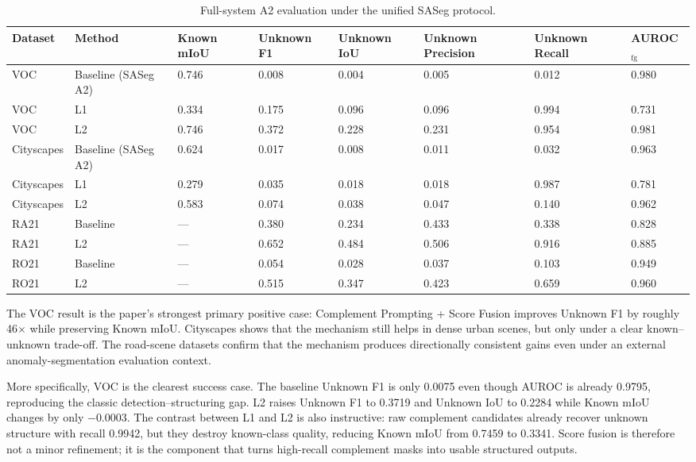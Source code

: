 \documentclass[a4paper,fleqn]{cas-dc}
\newcommand{\method}{Complement Prompting + Score Fusion}
\begin{document}
\begin{table}[!t]
  \caption{Full-system A2 evaluation under the unified SASeg protocol.}
  \label{tab:main-results}
  \centering
  \begin{tabular}{llllllll}
    \toprule
    Dataset & Method & Known mIoU & Unknown F1 & Unknown IoU & Unknown Precision & Unknown Recall & AUROC$_{\text{fg}}$ \\
    \midrule
    VOC & Baseline (SASeg A2) & 0.746 & 0.008 & 0.004 & 0.005 & 0.012 & 0.980 \\
    VOC & L1 & 0.334 & 0.175 & 0.096 & 0.096 & 0.994 & 0.731 \\
    VOC & L2 & 0.746 & 0.372 & 0.228 & 0.231 & 0.954 & 0.981 \\
    Cityscapes & Baseline (SASeg A2) & 0.624 & 0.017 & 0.008 & 0.011 & 0.032 & 0.963 \\
    Cityscapes & L1 & 0.279 & 0.035 & 0.018 & 0.018 & 0.987 & 0.781 \\
    Cityscapes & L2 & 0.583 & 0.074 & 0.038 & 0.047 & 0.140 & 0.962 \\
    RA21 & Baseline & --- & 0.380 & 0.234 & 0.433 & 0.338 & 0.828 \\
    RA21 & L2 & --- & 0.652 & 0.484 & 0.506 & 0.916 & 0.885 \\
    RO21 & Baseline & --- & 0.054 & 0.028 & 0.037 & 0.103 & 0.949 \\
    RO21 & L2 & --- & 0.515 & 0.347 & 0.423 & 0.659 & 0.960 \\
    \bottomrule
  \end{tabular}
\end{table}

The VOC result is the paper's strongest primary positive case: \method{} improves Unknown F1 by roughly 46$\times$ while preserving Known mIoU. Cityscapes shows that the mechanism still helps in dense urban scenes, but only under a clear known--unknown trade-off. The road-scene datasets confirm that the mechanism produces directionally consistent gains even under an external anomaly-segmentation evaluation context.

More specifically, VOC is the clearest success case. The baseline Unknown F1 is only 0.0075 even though AUROC is already 0.9795, reproducing the classic detection--structuring gap. L2 raises Unknown F1 to 0.3719 and Unknown IoU to 0.2284 while Known mIoU changes by only $-0.0003$. The contrast between L1 and L2 is also instructive: raw complement candidates already recover unknown structure with recall 0.9942, but they destroy known-class quality, reducing Known mIoU from 0.7459 to 0.3341. Score fusion is therefore not a minor refinement; it is the component that turns high-recall complement masks into usable structured outputs.
\end{document}
